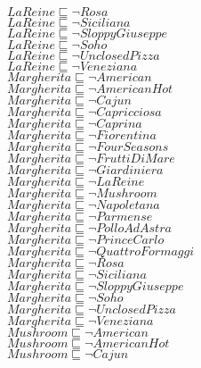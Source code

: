 \documentclass[a4paper,10pt]{article}
\begin{document}
 $LaReine \sqsubseteq  \lnot Rosa$\\ 
 $LaReine \sqsubseteq  \lnot Siciliana$\\ 
 $LaReine \sqsubseteq  \lnot SloppyGiuseppe$\\ 
 $LaReine \sqsubseteq  \lnot Soho$\\ 
 $LaReine \sqsubseteq  \lnot UnclosedPizza$\\ 
 $LaReine \sqsubseteq  \lnot Veneziana$\\ 
 $Margherita \sqsubseteq  \lnot American$\\ 
 $Margherita \sqsubseteq  \lnot AmericanHot$\\ 
 $Margherita \sqsubseteq  \lnot Cajun$\\ 
 $Margherita \sqsubseteq  \lnot Capricciosa$\\ 
 $Margherita \sqsubseteq  \lnot Caprina$\\ 
 $Margherita \sqsubseteq  \lnot Fiorentina$\\ 
 $Margherita \sqsubseteq  \lnot FourSeasons$\\ 
 $Margherita \sqsubseteq  \lnot FruttiDiMare$\\ 
 $Margherita \sqsubseteq  \lnot Giardiniera$\\ 
 $Margherita \sqsubseteq  \lnot LaReine$\\ 
 $Margherita \sqsubseteq  \lnot Mushroom$\\ 
 $Margherita \sqsubseteq  \lnot Napoletana$\\ 
 $Margherita \sqsubseteq  \lnot Parmense$\\ 
 $Margherita \sqsubseteq  \lnot PolloAdAstra$\\ 
 $Margherita \sqsubseteq  \lnot PrinceCarlo$\\ 
 $Margherita \sqsubseteq  \lnot QuattroFormaggi$\\ 
 $Margherita \sqsubseteq  \lnot Rosa$\\ 
 $Margherita \sqsubseteq  \lnot Siciliana$\\ 
 $Margherita \sqsubseteq  \lnot SloppyGiuseppe$\\ 
 $Margherita \sqsubseteq  \lnot Soho$\\ 
 $Margherita \sqsubseteq  \lnot UnclosedPizza$\\ 
 $Margherita \sqsubseteq  \lnot Veneziana$\\ 
 $Mushroom \sqsubseteq  \lnot American$\\ 
 $Mushroom \sqsubseteq  \lnot AmericanHot$\\ 
 $Mushroom \sqsubseteq  \lnot Cajun$\\ 
\end{document}
